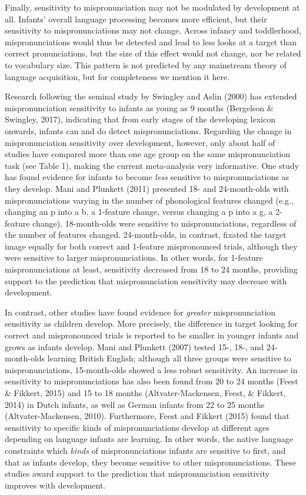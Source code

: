 \documentclass[man]{apa6}
\theoremstyle{definition}
\theoremstyle{definition}
\theoremstyle{definition}
\theoremstyle{remark}
\begin{document}
Finally, sensitivity to mispronunciation may not be modulated by
development at all. Infants' overall language processing becomes more
efficient, but their sensitivity to mispronunciations may not change.
Across infancy and toddlerhood, mispronunciations would thus be detected
and lead to less looks at a target than correct pronunciations, but the
size of this effect would not change, nor be related to vocabulary size.
This pattern is not predicted by any mainstream theory of language
acquisition, but for completeness we mention it here.

Research following the seminal study by Swingley and Aslin (2000) has
extended mispronunciation sensitivity to infants as young as 9 months
(Bergelson \& Swingley, 2017), indicating that from early stages of the
developing lexicon onwards, infants can and do detect mispronunciations.
Regarding the change in mispronunciation sensitivity over development,
however, only about half of studies have compared more than one age
group on the same mispronunciation task (see Table 1), making the
current meta-analysis very informative. One study has found evidence for
infants to become \emph{less} sensitive to mispronunciations as they
develop. Mani and Plunkett (2011) presented 18- and 24-month-olds with
mispronunciations varying in the number of phonological features changed
(e.g., changing an p into a b, a 1-feature change, versus changing a p
into a g, a 2-feature change). 18-month-olds were sensitive to
mispronunciations, regardless of the number of features changed.
24-month-olds, in contrast, fixated the target image equally for both
correct and 1-feature mispronounced trials, although they were sensitive
to larger mispronunciations. In other words, for 1-feature
mispronunciations at least, sensitivity decreased from 18 to 24 months,
providing support to the prediction that mispronunciation sensitivity
may decrease with development.

In contrast, other studies have found evidence for \emph{greater}
mispronunciation sensitivity as children develop. More precisely, the
difference in target looking for correct and mispronounced trials is
reported to be smaller in younger infants and grows as infants develop.
Mani and Plunkett (2007) tested 15-, 18-, and 24-month-olds learning
British English; although all three groups were sensitive to
mispronunciations, 15-month-olds showed a less robust sensitivity. An
increase in sensitivity to mispronunciations has also been found from 20
to 24 months (Feest \& Fikkert, 2015) and 15 to 18 months
(Altvater-Mackensen, Feest, \& Fikkert, 2014) in Dutch infants, as well
as German infants from 22 to 25 months (Altvater-Mackensen, 2010).
Furthermore, Feest and Fikkert (2015) found that sensitivity to specific
kinds of mispronunciations develop at different ages depending on
language infants are learning. In other words, the native language
constraints which \emph{kinds} of mispronunciations infants are
sensitive to first, and that as infants develop, they become sensitive
to other mispronunciations. These studies award support to the
prediction that mispronunciation sensitivity improves with development.
\end{document}
